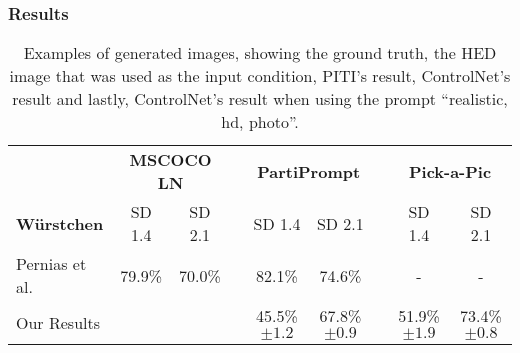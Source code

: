 \subsubsection{Results}
\begin{table}[t]
    \caption{Examples of generated images, showing the ground truth, the HED image that was used as the input condition, PITI's result, ControlNet's result and lastly, ControlNet's result when using the prompt ``realistic, hd, photo''.}
    \label{tab:wuerstchen:results}
    \centering
    \begin{tabular}{lcccccccc}
        \toprule
                                                 & \multicolumn{2}{c}{\textbf{MSCOCO LN}} & \phantom{0} & \multicolumn{2}{c}{\textbf{PartiPrompt}} & \phantom{0}           & \multicolumn{2}{c}{\textbf{Pick-a-Pic}}                                                               \\
        \cmidrule{2-3}\cmidrule{5-6}\cmidrule{8-9}
        \textbf{W\"urstchen}                     & SD 1.4                                 & SD 2.1      & \phantom{0}                              & SD 1.4                & SD 2.1                                  & \phantom{0} & SD 1.4                & SD 2.1                \\
        \midrule
        Pernias et al.\cite{pernias2024wrstchen} & 79.9\%                                 & 70.0\%      & \phantom{0}                              & 82.1\%                & 74.6\%                                  & \phantom{0} & -                     & -                     \\
        Our Results                              &                                        &             & \phantom{0}                              & 45.5\%{\tiny$\pm1.2$} & 67.8\%{\tiny$\pm0.9$}                   & \phantom{0} & 51.9\%{\tiny$\pm1.9$} & 73.4\%{\tiny$\pm0.8$} \\
        \bottomrule
    \end{tabular}
\end{table}